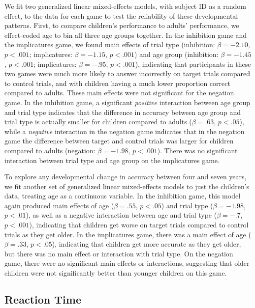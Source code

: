 \documentclass[10pt,letterpaper]{article}
\begin{document}
We fit two generalized linear mixed-effects models, with subject ID as a random effect, to the data for each game to test the reliability of these developmental patterns.  First, to compare children's performance to adults' performance, we effect-coded age to bin all three age groups together.  In the inhibition game and the implicatures game, we found main effects of trial type (inhibition: $\beta = -2.10$, $p< .001$; implicatures: $\beta = -1.15$, $p< .001$) and age group (inhibition: $\beta = -1.45$, $p< .001$; implicatures: $\beta = -.95$, $p< .001$), indicating that participants in these two games were much more likely to answer incorrectly on target trials compared to control trials, and with children having a much lower proportion correct compared to adults. These main effects were not significant for the negation game.  In the inhibition game, a significant \emph{positive} interaction between age group and trial type indicates that the difference in accuracy between age group and trial type is actually smaller for children compared to adults ($\beta = .63$, $p< .05$), while a \emph{negative} interaction in the negation game indicates that in the negation game the difference between target and control trials was larger for children compared to adults (negation: $\beta = -1.98$, $p< .001$).  There was no significant interaction between trial type and age group on the implicatures game.  

To explore any developmental change in accuracy between four and seven years, we fit another set of generalized linear mixed-effects models to just the children's data, treating age as a continuous variable.  In the inhibition game, this model again produced main effects of age ($\beta = .55$, $p< .05$) and trial type ($\beta = -1.98$, $p< .01$), as well as a negative interaction between age and trial type ($\beta = -.7$, $p< .001$), indicating that children get worse on target trials compared to control trials as they get older.  In the implicatures game, there was a main effect of age ($\beta = .33$, $p< .05$), indicating that children get more accurate as they get older, but there was no main effect or interaction with trial type.  On the negation game, there were no significant main effects or interactions, suggesting that older children were not significantly better than younger children on this game.

\subsection{Reaction Time}
\end{document}
